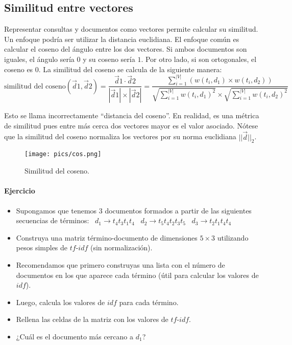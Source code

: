\subsection{Similitud entre vectores}
Representar consultas y documentos como vectores permite calcular su similitud. Un enfoque podría ser utilizar la distancia euclidiana. El enfoque común es calcular el coseno del ángulo entre los dos vectores. Si ambos documentos son iguales, el ángulo sería $0$ y su coseno sería $1$. Por otro lado, si son ortogonales, el coseno es $0$. La similitud del coseno se calcula de la siguiente manera:
\begin{displaymath}
\text{similitud del coseno}(\vec{d}{1},\vec{d}{2})= \frac{\vec{d}{1}\cdot \vec{d}{2}}{|\vec{d}{1}|\times|\vec{d}{2}|} = \frac{\sum_{i=1}^{|V|}(w(t_{i},d_{1})\times w(t_{i},d_{2}))}{\sqrt{\sum_{i=1}^{|V|} w(t_{i},d_{1})^2}\times \sqrt{\sum_{i=1}^{|V|} w(t_{i},d_{2})^2}}
\end{displaymath}

Esto se llama incorrectamente ``distancia del coseno''. En realidad, es una métrica de similitud pues entre más cerca dos vectores mayor es el valor asociado. Nótese que la similitud del coseno normaliza los vectores por su norma euclidiana $||\vec{d}||_{2}$.

\begin{figure}[h!]
\centering
\texttt{[image: pics/cos.png]}
\caption{Similitud del coseno.}
\end{figure}

\paragraph{Ejercicio}
\begin{itemize}
\item Supongamos que tenemos $3$ documentos formados a partir de las siguientes secuencias de términos: \
$d_{1}\rightarrow t_{4}t_{3}t_{1}t_{4}$ \
$d_{2}\rightarrow t_{5}t_{4}t_{2}t_{3}t_{5}$ \
$d_{3}\rightarrow t_{2}t_{1}t_{4}t_{4}$ \
\item Construya una matriz término-documento de dimensiones $5\times3$ utilizando pesos simples de $tf$-$idf$ (sin normalización).
\item Recomendamos que primero construyas una lista con el número de documentos en los que aparece cada término (útil para calcular los valores de $idf$).
\item Luego, calcula los valores de $idf$ para cada término.
\item Rellena las celdas de la matriz con los valores de $tf$-$idf$.
\item ¿Cuál es el documento más cercano a $d_{1}$?
\end{itemize}

